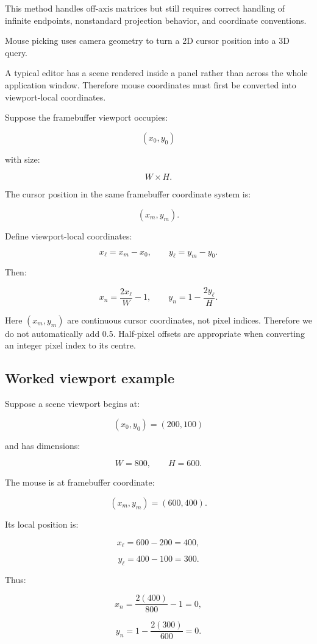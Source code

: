 This method handles off-axis matrices but still requires correct handling of infinite endpoints, nonstandard projection behavior, and coordinate conventions.

Mouse picking uses camera geometry to turn a 2D cursor position into a 3D query.

A typical editor has a scene rendered inside a panel rather than across the whole application window. Therefore mouse coordinates must first be converted into viewport-local coordinates.

Suppose the framebuffer viewport occupies:

\[ (x_0,y_0) \]

with size:

\[ W\times H. \]

The cursor position in the same framebuffer coordinate system is:

\[ (x_m,y_m). \]

Define viewport-local coordinates:

\[ \boxed{ x_\ell=x_m-x_0, \qquad y_\ell=y_m-y_0. } \]

Then:

\[ \boxed{ x_n=\frac{2x_\ell}{W}-1, \qquad y_n=1-\frac{2y_\ell}{H}. } \]

Here \((x_m,y_m)\) are continuous cursor coordinates, not pixel indices. Therefore we do not automatically add 0.5. Half-pixel offsets are appropriate when converting an integer pixel index to its centre.

\subsection{Worked viewport example}\label{02-foundations-ii-ch035-worked-viewport-example}

Suppose a scene viewport begins at:

\[ (x_0,y_0)=(200,100) \]

and has dimensions:

\[ W=800,\qquad H=600. \]

The mouse is at framebuffer coordinate:

\[ (x_m,y_m)=(600,400). \]

Its local position is:

\[ x_\ell=600-200=400, \]

\[ y_\ell=400-100=300. \]

Thus:

\[ x_n=\frac{2(400)}{800}-1=0, \]

\[ y_n=1-\frac{2(300)}{600}=0. \]

